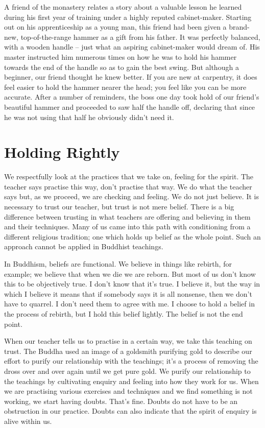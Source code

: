 A friend of the monastery relates a story about a valuable lesson he
learned during his first year of training under a highly reputed
cabinet-maker. Starting out on his apprenticeship as a young man, this
friend had been given a brand-new, top-of-the-range hammer as a gift
from his father. It was perfectly balanced, with a wooden handle -- just
what an aspiring cabinet-maker would dream of. His master instructed him
numerous times on how he was to hold his hammer towards the end of the
handle so as to gain the best swing. But although a beginner, our friend
thought he knew better. If you are new at carpentry, it does feel easier
to hold the hammer nearer the head; you feel like you can be more
accurate. After a number of reminders, the boss one day took hold of our
friend's beautiful hammer and proceeded to saw half the handle off,
declaring that since he was not using that half he obviously didn't need
it.

\section{Holding Rightly}

We respectfully look at the practices that we take on, feeling for the
spirit. The teacher says practise this way, don't practise that way. We
do what the teacher says but, as we proceed, we are checking and
feeling. We do not just believe. It is necessary to trust our teacher,
but trust is not mere belief. There is a big difference between trusting
in what teachers are offering and believing in them and their
techniques. Many of us came into this path with conditioning from a
different religious tradition; one which holds up belief as the whole
point. Such an approach cannot be applied in Buddhist teachings.

In Buddhism, beliefs are functional. We believe in things like rebirth,
for example; we believe that when we die we are reborn. But most of us
don't know this to be objectively true. I don't know that it's true. I
believe it, but the way in which I believe it means that if somebody
says it is all nonsense, then we don't have to quarrel. I don't need
them to agree with me. I choose to hold a belief in the process of
rebirth, but I hold this belief lightly. The belief is not the end
point.

When our teacher tells us to practise in a certain way, we take this
teaching on trust. The Buddha used an image of a goldsmith purifying
gold to describe our effort to purify our relationship with the
teachings; it's a process of removing the dross over and over again
until we get pure gold. We purify our relationship to the teachings by
cultivating enquiry and feeling into how they work for us. When we are
practising various exercises and techniques and we find something is not
working, we start having doubts. That's fine. Doubts do not have to be
an obstruction in our practice. Doubts can also indicate that the spirit
of enquiry is alive within us.


